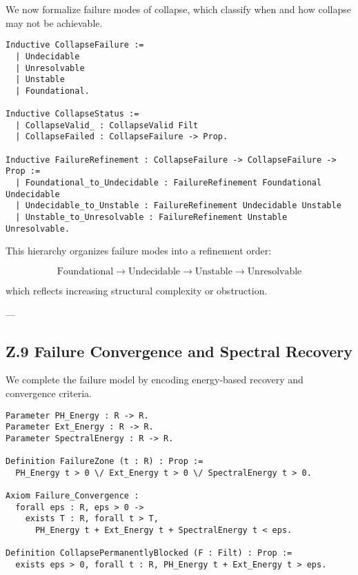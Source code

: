 \documentclass[11pt]{article}
\begin{document}
We now formalize failure modes of collapse, which classify when and how collapse may not be achievable.

\begin{lstlisting}[language=Coq]
Inductive CollapseFailure :=
  | Undecidable
  | Unresolvable
  | Unstable
  | Foundational.

Inductive CollapseStatus :=
  | CollapseValid_ : CollapseValid Filt
  | CollapseFailed : CollapseFailure -> Prop.

Inductive FailureRefinement : CollapseFailure -> CollapseFailure -> Prop :=
  | Foundational_to_Undecidable : FailureRefinement Foundational Undecidable
  | Undecidable_to_Unstable : FailureRefinement Undecidable Unstable
  | Unstable_to_Unresolvable : FailureRefinement Unstable Unresolvable.
\end{lstlisting}

This hierarchy organizes failure modes into a refinement order:

\[
\text{Foundational} \rightarrow \text{Undecidable} \rightarrow \text{Unstable} \rightarrow \text{Unresolvable}
\]

which reflects increasing structural complexity or obstruction.

---

\subsection*{Z.9 Failure Convergence and Spectral Recovery}

We complete the failure model by encoding energy-based recovery and convergence criteria.

\begin{lstlisting}[language=Coq]
Parameter PH_Energy : R -> R.
Parameter Ext_Energy : R -> R.
Parameter SpectralEnergy : R -> R.

Definition FailureZone (t : R) : Prop :=
  PH_Energy t > 0 \/ Ext_Energy t > 0 \/ SpectralEnergy t > 0.

Axiom Failure_Convergence :
  forall eps : R, eps > 0 ->
    exists T : R, forall t > T,
      PH_Energy t + Ext_Energy t + SpectralEnergy t < eps.

Definition CollapsePermanentlyBlocked (F : Filt) : Prop :=
  exists eps > 0, forall t : R, PH_Energy t + Ext_Energy t > eps.

\end{lstlisting}
\end{document}
